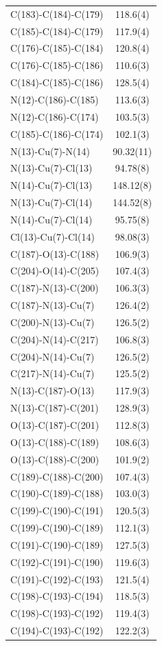 \begin{center}
{\begin{supertabular}{p{1.5in}c}
C(183)-C(184)-C(179)&118.6(4)\\
C(185)-C(184)-C(179)&117.9(4)\\
C(176)-C(185)-C(184)&120.8(4)\\
C(176)-C(185)-C(186)&110.6(3)\\
C(184)-C(185)-C(186)&128.5(4)\\
N(12)-C(186)-C(185)&113.6(3)\\
N(12)-C(186)-C(174)&103.5(3)\\
C(185)-C(186)-C(174)&102.1(3)\\
N(13)-Cu(7)-N(14)&90.32(11)\\
N(13)-Cu(7)-Cl(13)&94.78(8)\\
N(14)-Cu(7)-Cl(13)&148.12(8)\\
N(13)-Cu(7)-Cl(14)&144.52(8)\\
N(14)-Cu(7)-Cl(14)&95.75(8)\\
Cl(13)-Cu(7)-Cl(14)&98.08(3)\\
C(187)-O(13)-C(188)&106.9(3)\\
C(204)-O(14)-C(205)&107.4(3)\\
C(187)-N(13)-C(200)&106.3(3)\\
C(187)-N(13)-Cu(7)&126.4(2)\\
C(200)-N(13)-Cu(7)&126.5(2)\\
C(204)-N(14)-C(217)&106.8(3)\\
C(204)-N(14)-Cu(7)&126.5(2)\\
C(217)-N(14)-Cu(7)&125.5(2)\\
N(13)-C(187)-O(13)&117.9(3)\\
N(13)-C(187)-C(201)&128.9(3)\\
O(13)-C(187)-C(201)&112.8(3)\\
O(13)-C(188)-C(189)&108.6(3)\\
O(13)-C(188)-C(200)&101.9(2)\\
C(189)-C(188)-C(200)&107.4(3)\\
C(190)-C(189)-C(188)&103.0(3)\\
C(199)-C(190)-C(191)&120.5(3)\\
C(199)-C(190)-C(189)&112.1(3)\\
C(191)-C(190)-C(189)&127.5(3)\\
C(192)-C(191)-C(190)&119.6(3)\\
C(191)-C(192)-C(193)&121.5(4)\\
C(198)-C(193)-C(194)&118.5(3)\\
C(198)-C(193)-C(192)&119.4(3)\\
C(194)-C(193)-C(192)&122.2(3)\\

\end{supertabular}}
\end{center}
